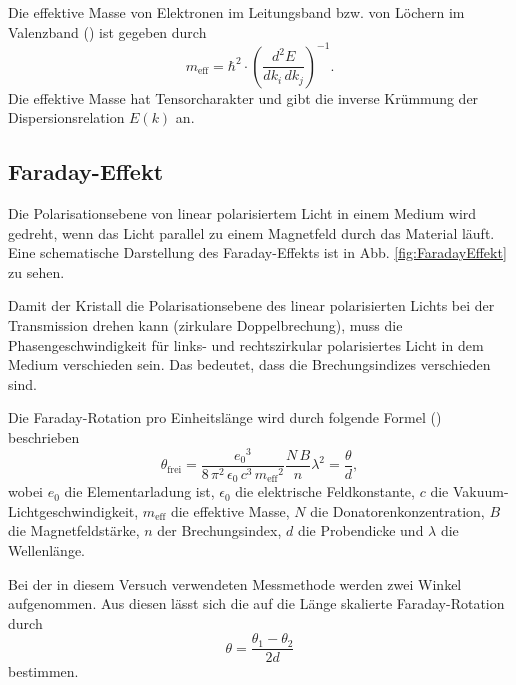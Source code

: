 Die effektive Masse von Elektronen im Leitungsband bzw. von Löchern im Valenzband (\cite{demtroeder}) ist gegeben durch
\begin{equation*}
    m_\text{eff} = \hbar^2 \cdot \left( \frac{d^2 E}{dk_i \, dk_j} \right)^{-1}.
\end{equation*}
Die effektive Masse hat Tensorcharakter und gibt die inverse Krümmung der Dispersionsrelation $E(k)$ an. \cite{demtroeder}

\subsection{Faraday-Effekt}
Die Polarisationsebene von linear polarisiertem Licht in einem Medium wird gedreht, wenn das Licht parallel zu einem Magnetfeld durch das Material läuft. \cite{heintze}
Eine schematische Darstellung des Faraday-Effekts ist in Abb. \ref{fig:FaradayEffekt} zu sehen.

Damit der Kristall die Polarisationsebene des linear polarisierten Lichts bei der Transmission drehen kann (zirkulare Doppelbrechung), muss die Phasengeschwindigkeit für links- und rechtszirkular polarisiertes Licht in dem Medium verschieden sein. Das bedeutet, dass die Brechungsindizes verschieden sind. \cite{V46}

Die Faraday-Rotation pro Einheitslänge wird durch folgende Formel (\cite{V46}) beschrieben
\begin{equation}
    \theta_\text{frei} = \frac{{e_0}^3}{8 \, \pi^2 \, \epsilon_0 \, c^3 \, {m_\text{eff}}^2} \frac{N \, B}{n} \lambda^2 = \frac{\theta}{d},
    \label{eq:theta}
\end{equation}
wobei $e_0$ die Elementarladung ist, $\epsilon_0$ die elektrische Feldkonstante, $c$ die Vakuum-Lichtgeschwindigkeit, $m_\text{eff}$ die effektive Masse, $N$ die Donatorenkonzentration, $B$ die Magnetfeldstärke, $n$ der Brechungsindex, $d$ die Probendicke und $\lambda$ die Wellenlänge.

Bei der in diesem Versuch verwendeten Messmethode werden zwei Winkel aufgenommen. Aus diesen lässt sich die auf die Länge skalierte Faraday-Rotation durch
\begin{equation}
    \theta = \frac{\theta_1 - \theta_2}{2d}
    \label{eq:rotation}
\end{equation}
bestimmen.

